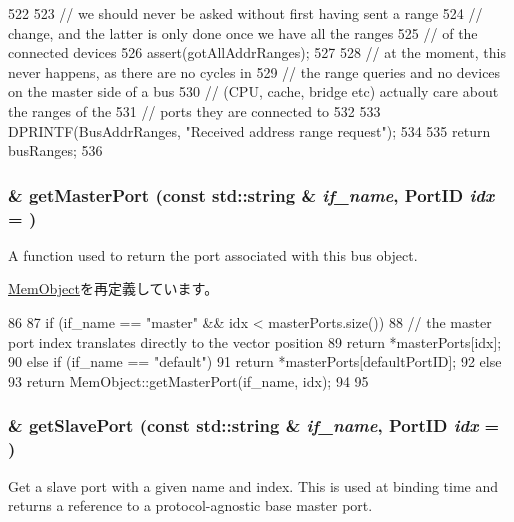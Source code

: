 \begin{DoxyCode}
522 {
523     // we should never be asked without first having sent a range
524     // change, and the latter is only done once we have all the ranges
525     // of the connected devices
526     assert(gotAllAddrRanges);
527 
528     // at the moment, this never happens, as there are no cycles in
529     // the range queries and no devices on the master side of a bus
530     // (CPU, cache, bridge etc) actually care about the ranges of the
531     // ports they are connected to
532 
533     DPRINTF(BusAddrRanges, "Received address range request\n");
534 
535     return busRanges;
536 }
\end{DoxyCode}
\hypertarget{classBaseBus_adc4e675e51defbdd1e354dac729d0703}{
\subsubsection[{getMasterPort}]{ \& getMasterPort (const std::string \& {\em if\_\-name}, \/  {\bf PortID} {\em idx} = {})}}
\label{classBaseBus_adc4e675e51defbdd1e354dac729d0703}
A function used to return the port associated with this bus object. 

\hyperlink{classMemObject_adc4e675e51defbdd1e354dac729d0703}{MemObject}を再定義しています。


\begin{DoxyCode}
86 {
87     if (if_name == "master" && idx < masterPorts.size()) {
88         // the master port index translates directly to the vector position
89         return *masterPorts[idx];
90     } else  if (if_name == "default") {
91         return *masterPorts[defaultPortID];
92     } else {
93         return MemObject::getMasterPort(if_name, idx);
94     }
95 }
\end{DoxyCode}
\hypertarget{classBaseBus_ac918a145092d7514ebc6dbd952dceafb}{
\subsubsection[{getSlavePort}]{ \& getSlavePort (const std::string \& {\em if\_\-name}, \/  {\bf PortID} {\em idx} = {})}}
\label{classBaseBus_ac918a145092d7514ebc6dbd952dceafb}
Get a slave port with a given name and index. This is used at binding time and returns a reference to a protocol-\/agnostic base master port.


